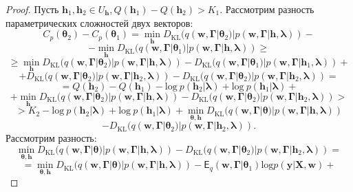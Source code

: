 \begin{proof}
Пусть $\mathbf{h}_1, \mathbf{h}_2 \in U_\mathbf{h}, Q(\mathbf{h}_1)-Q(\mathbf{h}_2)>K_1$.
Рассмотрим разность параметрических сложностей двух векторов:
\[
C_p(\boldsymbol{\theta}_2)-C_p(\boldsymbol{\theta}_1) = \min_{\mathbf{h}} D_\text{KL}(q(\mathbf{w}, \boldsymbol{\Gamma}|\boldsymbol{\theta}_2)|p(\mathbf{w}, \boldsymbol{\Gamma}|\mathbf{h}, \boldsymbol{\lambda}))-
\]
\[
-\min_{\mathbf{h}} D_\text{KL}(q(\mathbf{w}, \boldsymbol{\Gamma}|\boldsymbol{\theta}_1)|p(\mathbf{w}, \boldsymbol{\Gamma}|\mathbf{h}, \boldsymbol{\lambda})) \geq
\]
\[
\geq
\min_{\mathbf{h}} D_\text{KL}(q(\mathbf{w}, \boldsymbol{\Gamma}|\boldsymbol{\theta}_2)|p(\mathbf{w}, \boldsymbol{\Gamma}|\mathbf{h}, \boldsymbol{\lambda}))- D_\text{KL}(q(\mathbf{w}, \boldsymbol{\Gamma}|\boldsymbol{\theta}_1)|p(\mathbf{w}, \boldsymbol{\Gamma}|\mathbf{h}_1, \boldsymbol{\lambda})) +
\]
\[
+D_\text{KL}(q(\mathbf{w}, \boldsymbol{\Gamma}|\boldsymbol{\theta}_2)|p(\mathbf{w}, \boldsymbol{\Gamma}|\mathbf{h}_2, \boldsymbol{\lambda})) - D_\text{KL}(q(\mathbf{w}, \boldsymbol{\Gamma}|\boldsymbol{\theta}_2)|p(\mathbf{w}, \boldsymbol{\Gamma}|\mathbf{h}_2, \boldsymbol{\lambda})) =
\]
\[
= Q(\mathbf{h}_2)-Q(\mathbf{h}_1)-\text{log}~p (\mathbf{h}_2|\boldsymbol{\lambda})+\text{log}~p (\mathbf{h}_1|\boldsymbol{\lambda})+
\]
\[+\min_{\mathbf{h}} D_\text{KL}(q(\mathbf{w}, \boldsymbol{\Gamma}|\boldsymbol{\theta}_2)|p(\mathbf{w}, \boldsymbol{\Gamma}|\mathbf{h}, \boldsymbol{\lambda})) -  D_\text{KL}(q(\mathbf{w}, \boldsymbol{\Gamma}|\boldsymbol{\theta}_2)|p(\mathbf{w}, \boldsymbol{\Gamma}|\mathbf{h}_2, \boldsymbol{\lambda})) >
\]
\[
>K_2 -\text{log}~p (\mathbf{h}_2|\boldsymbol{\lambda})+\text{log}~p (\mathbf{h}_1|\boldsymbol{\lambda}) + \min_{\boldsymbol{\theta}, \mathbf{h}} D_\text{KL}(q(\mathbf{w}, \boldsymbol{\Gamma}|\boldsymbol{\theta})|p(\mathbf{w}, \boldsymbol{\Gamma}|\mathbf{h}, \boldsymbol{\lambda})) 
\]
\[
-  D_\text{KL}(q(\mathbf{w}, \boldsymbol{\Gamma}|\boldsymbol{\theta}_2)|p(\mathbf{w}, \boldsymbol{\Gamma}|\mathbf{h}_2, \boldsymbol{\lambda})).
\]
Рассмотрим разность:
\[\min_{\boldsymbol{\theta}, \mathbf{h}} D_\text{KL}(q(\mathbf{w}, \boldsymbol{\Gamma}|\boldsymbol{\theta})|p(\mathbf{w}, \boldsymbol{\Gamma}|\mathbf{h}, \boldsymbol{\lambda}))  - D_\text{KL}(q(\mathbf{w}, \boldsymbol{\Gamma}|\boldsymbol{\theta}_2)|p(\mathbf{w}, \boldsymbol{\Gamma}|\mathbf{h}_2, \boldsymbol{\lambda})) =
\]
\[
= \min_{\boldsymbol{\theta}, \mathbf{h}} D_\text{KL}(q(\mathbf{w}, \boldsymbol{\Gamma}|\boldsymbol{\theta})|p(\mathbf{w}, \boldsymbol{\Gamma}|\mathbf{h}, \boldsymbol{\lambda}))  - \mathsf{E}_q(\mathbf{w}, \boldsymbol{\Gamma}|\boldsymbol{\theta}_1) \text{log} p(\mathbf{y}|\mathbf{X}, \mathbf{w}) +
\]
\end{proof}
